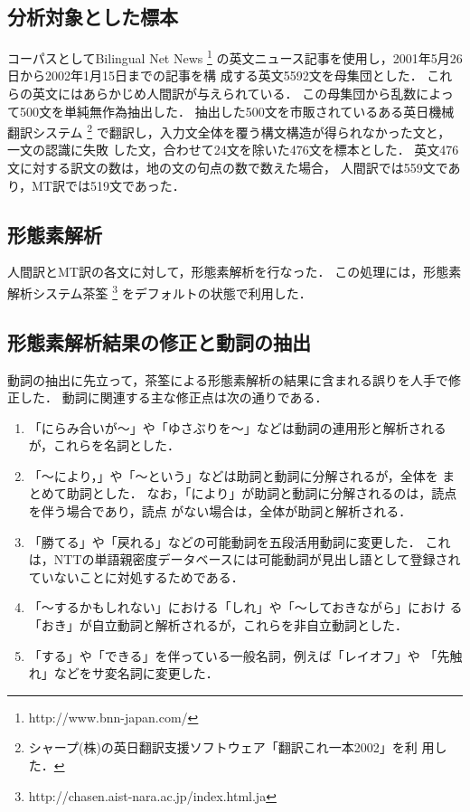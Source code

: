 \subsection{分析対象とした標本}
\label{sec:method:corpus}

コーパスとしてBilingual Net News
\footnote{http://www.bnn-japan.com/}
の英文ニュース記事を使用し，2001年5月26日から2002年1月15日までの記事を構
成する英文5592文を母集団とした．
これらの英文にはあらかじめ人間訳が与えられている．
この母集団から乱数によって500文を単純無作為抽出した．
抽出した500文を市販されているある英日機械翻訳システム
\footnote{シャープ(株)の英日翻訳支援ソフトウェア「翻訳これ一本2002」を利
用した．}
で翻訳し，入力文全体を覆う構文構造が得られなかった文と，一文の認識に失敗
した文，合わせて24文を除いた476文を標本とした．
英文476文に対する訳文の数は，地の文の句点の数で数えた場合，
人間訳では559文であり，MT訳では519文であった． 

\subsection{形態素解析}
\label{sec:method:morphy}

人間訳とMT訳の各文に対して，形態素解析を行なった．
この処理には，形態素解析システム茶筌
\footnote{http://chasen.aist-nara.ac.jp/index.html.ja}
をデフォルトの状態で利用した．

\subsection{形態素解析結果の修正と動詞の抽出}
\label{sec:method:extract}

動詞の抽出に先立って，茶筌による形態素解析の結果に含まれる誤りを人手で修
正した．
動詞に関連する主な修正点は次の通りである．
\begin{enumerate}
\item 「にらみ合いが〜」や「ゆさぶりを〜」などは動詞の連用形と解析される
が，これらを名詞とした．
\item 「〜により，」や「〜という」などは助詞と動詞に分解されるが，全体を
まとめて助詞とした．
なお，「により」が助詞と動詞に分解されるのは，読点を伴う場合であり，読点
がない場合は，全体が助詞と解析される．
\item 「勝てる」や「戻れる」などの可能動詞を五段活用動詞に変更した．
これは，NTTの単語親密度データベースには可能動詞が見出し語として登録され
ていないことに対処するためである．
\item 「〜するかもしれない」における「しれ」や「〜しておきながら」におけ
る「おき」が自立動詞と解析されるが，これらを非自立動詞とした．
\item 「する」や「できる」を伴っている一般名詞，例えば「レイオフ」や
「先触れ」などをサ変名詞に変更した．
\end{enumerate}

